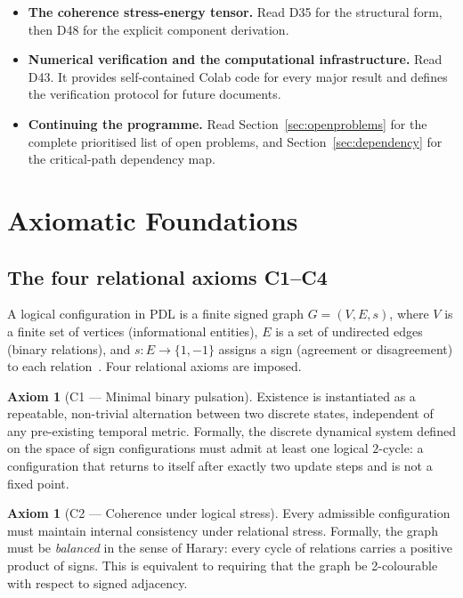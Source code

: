 \documentclass[11pt,a4paper]{article}
\theoremstyle{plain}
\theoremstyle{definition}
\newtheorem{axiom}[theorem]{Axiom}
\theoremstyle{remark}
\begin{document}
\begin{itemize}
\item \textbf{The coherence stress-energy tensor.} Read D35 for the structural form, then D48 for the explicit component derivation.
\item \textbf{Numerical verification and the computational infrastructure.} Read D43. It provides self-contained Colab code for every major result and defines the verification protocol for future documents.
\item \textbf{Continuing the programme.} Read Section~\ref{sec:openproblems} for the complete prioritised list of open problems, and Section~\ref{sec:dependency} for the critical-path dependency map.
\end{itemize}

\section{Axiomatic Foundations}
\label{sec:axioms}

\subsection{The four relational axioms C1--C4}
\label{subsec:axioms}
A logical configuration in PDL is a finite signed graph $G=(V,E,s)$, where $V$ is a finite set of vertices (informational entities), $E$ is a set of undirected edges (binary relations), and $s\colon E\to\{1,-1\}$ assigns a sign (agreement or disagreement) to each relation~\cite{D01,D02}. Four relational axioms are imposed.

\begin{axiom}[C1 --- Minimal binary pulsation]
Existence is instantiated as a repeatable, non-trivial alternation between two discrete states, independent of any pre-existing temporal metric. Formally, the discrete dynamical system defined on the space of sign configurations must admit at least one logical $2$-cycle: a configuration that returns to itself after exactly two update steps and is not a fixed point.
\end{axiom}

\begin{axiom}[C2 --- Coherence under logical stress]
Every admissible configuration must maintain internal consistency under relational stress. Formally, the graph must be \emph{balanced} in the sense of Harary: every cycle of relations carries a positive product of signs. This is equivalent to requiring that the graph be 2-colourable with respect to signed adjacency.
\end{axiom}
\end{document}
